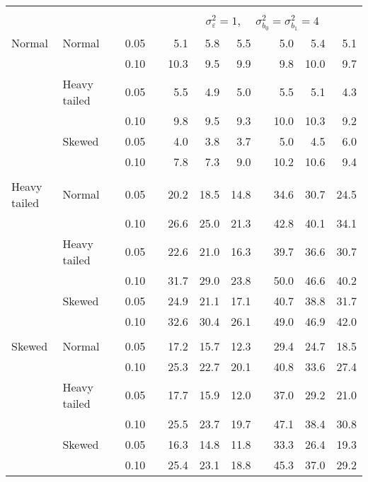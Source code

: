 \begin{table}[ht]
\begin{scriptsize}
\begin{tabular}{ll p{.1cm} c p{.1cm} rrr p{.1cm} rrr}
&&&&&&&&&&&\\
& && && \multicolumn{7}{c}{$\sigma_{\varepsilon}^2 = 1$, \ \ $\sigma_{b_0}^2 = \sigma_{b_1}^2 = 4$} \\ \cline{6-12}
\rowcolor{gray!20} Normal & Normal &  & 0.05 &  & 5.1 & 5.8 & 5.5 &  & 5.0 & 5.4 & 5.1 \\ 
\rowcolor{gray!20}    &  &  & 0.10 &  & 10.3 & 9.5 & 9.9 &  & 9.8 & 10.0 & 9.7 \\ 
\rowcolor{gray!20}    & Heavy tailed &  & 0.05 &  & 5.5 & 4.9 & 5.0 &  & 5.5 & 5.1 & 4.3 \\ 
\rowcolor{gray!20}    &  &  & 0.10 &  & 9.8 & 9.5 & 9.3 &  & 10.0 & 10.3 & 9.2 \\ 
\rowcolor{gray!20}    & Skewed &  & 0.05 &  & 4.0 & 3.8 & 3.7 &  & 5.0 & 4.5 & 6.0 \\ 
\rowcolor{gray!20}    &  &  & 0.10 &  & 7.8 & 7.3 & 9.0 &  & 10.2 & 10.6 & 9.4 \\ 
&&&&&&&&&&&\\
  Heavy tailed & Normal &  & 0.05 &  & 20.2 & 18.5 & 14.8 &  & 34.6 & 30.7 & 24.5 \\ 
   &  &  & 0.10 &  & 26.6 & 25.0 & 21.3 &  & 42.8 & 40.1 & 34.1 \\ 
   & Heavy tailed &  & 0.05 &  & 22.6 & 21.0 & 16.3 &  & 39.7 & 36.6 & 30.7 \\ 
   &  &  & 0.10 &  & 31.7 & 29.0 & 23.8 &  & 50.0 & 46.6 & 40.2 \\ 
   & Skewed &  & 0.05 &  & 24.9 & 21.1 & 17.1 &  & 40.7 & 38.8 & 31.7 \\ 
   &  &  & 0.10 &  & 32.6 & 30.4 & 26.1 &  & 49.0 & 46.9 & 42.0 \\ 
&&&&&&&&&&&\\
  Skewed & Normal &  & 0.05 &  & 17.2 & 15.7 & 12.3 &  & 29.4 & 24.7 & 18.5 \\ 
   &  &  & 0.10 &  & 25.3 & 22.7 & 20.1 &  & 40.8 & 33.6 & 27.4 \\ 
   & Heavy tailed &  & 0.05 &  & 17.7 & 15.9 & 12.0 &  & 37.0 & 29.2 & 21.0 \\ 
   &  &  & 0.10 &  & 25.5 & 23.7 & 19.7 &  & 47.1 & 38.4 & 30.8 \\ 
   & Skewed &  & 0.05 &  & 16.3 & 14.8 & 11.8 &  & 33.3 & 26.4 & 19.3 \\ 
   &  &  & 0.10 &  & 25.4 & 23.1 & 18.8 &  & 45.3 & 37.0 & 29.2 \\ 

\hline
\end{tabular}
\end{scriptsize}
\end{table}


